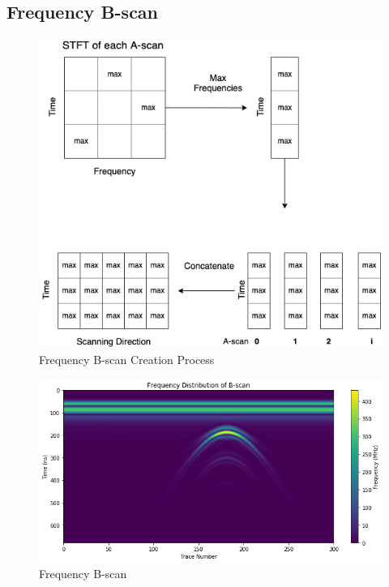 \subsection{Frequency B-scan}
\begin{figure}[H]
    \centering
    \includegraphics[width=\linewidth]{figures/bscan_processing.png}
    \caption{Frequency B-scan Creation Process}
    \label{fig:bscan_processing}
\end{figure}

\begin{figure}[H]
    \centering
    \includegraphics[width=\linewidth]{figures/stft_b_scan_clean.png}
    \caption{Frequency B-scan}
    \label{fig:tf-bscan}
\end{figure}


